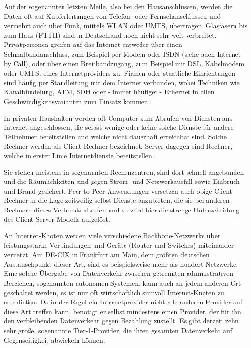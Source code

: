 Auf der sogenannten letzten Meile, also bei den Hausanschlüssen, werden die Daten oft auf Kupferleitungen von Telefon- oder Fernsehanschlüssen und vermehrt auch über Funk, mittels WLAN oder UMTS, übertragen. 
Glasfasern bis zum Haus (FTTH) sind in Deutschland noch nicht sehr weit verbreitet. Privatpersonen greifen auf das Internet entweder über einen Schmalbandanschluss, zum Beispiel per Modem oder ISDN (siehe auch Internet by Call), oder über einen Breitbandzugang, zum Beispiel mit DSL, Kabelmodem oder UMTS, eines Internetproviders zu. Firmen oder staatliche Einrichtungen sind häufig per Standleitung mit dem Internet verbunden, wobei Techniken wie Kanalbündelung, ATM, SDH oder - immer häufiger - Ethernet in allen Geschwindigkeitsvarianten zum Einsatz kommen.

In privaten Haushalten werden oft Computer zum Abrufen von Diensten ans Internet angeschlossen, die selbst wenige oder keine solche Dienste für andere Teilnehmer bereitstellen und welche nicht dauerhaft erreichbar sind. 
Solche Rechner werden als Client-Rechner bezeichnet. Server dagegen sind Rechner, welche in erster Linie Internetdienste bereitstellen. 


Sie stehen meistens in sogenannten Rechenzentren, sind dort schnell angebunden und die Räumlichkeiten sind gegen Strom- und Netzwerkausfall sowie Einbruch und Brand gesichert. Peer-to-Peer-Anwendungen versetzen auch obige Client-Rechner in die Lage zeitweilig selbst Dienste anzubieten, die sie bei anderen Rechnern dieses Verbunds abrufen und so wird hier die strenge Unterscheidung des Client-Server-Modells aufgelöst.

An Internet-Knoten werden viele verschiedene Backbone-Netzwerke über leistungsstarke Verbindungen und Geräte (Router und Switches) miteinander vernetzt. Am DE-CIX in Frankfurt am Main, dem größten deutschen Austauschpunkt dieser Art, sind es beispielsweise mehr als hundert Netzwerke. 
Eine solche Übergabe von Datenverkehr zwischen getrennten administrativen Bereichen, sogenannten autonomen Systemen, kann auch an jedem anderen Ort geschaltet werden, es ist nur oft wirtschaftlich sinnvoll Internet-Knoten zu erschließen. Da in der Regel ein Internetprovider nicht alle anderen Provider auf diese Art treffen kann, benötigt er selbst mindestens einen Provider, der für ihn den verbleibenden Datenverkehr gegen Bezahlung zustellt. 
Es gibt derzeit zehn sehr große, sogenannte Tier-1-Provider, die ihren gesamten Datenverkehr auf Gegenseitigkeit abwickeln können.

